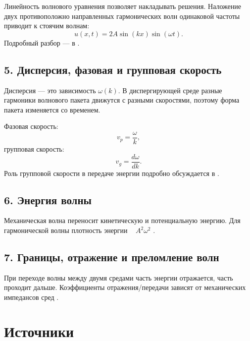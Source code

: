 Линейность волнового уравнения позволяет накладывать решения. Наложение двух 
противоположно направленных гармонических волн одинаковой частоты приводит к стоячим волнам:
\[
u(x,t) = 2A \sin(kx) \sin(\omega t).
\]
Подробный разбор — в \cite{openstax-waves, mit803}.

\subsection*{5. Дисперсия, фазовая и групповая скорость}

Дисперсия — это зависимость \(\omega(k)\). В диспергирующей среде разные гармоники волнового пакета движутся 
с разными скоростями, поэтому форма пакета изменяется со временем.

Фазовая скорость:
\[
v_p = \frac{\omega}{k},
\]
групповая скорость:
\[
v_g = \frac{d\omega}{dk}.
\]
Роль групповой скорости в передаче энергии подробно обсуждается в \cite{mit803}.

\subsection*{6. Энергия волны}

Механическая волна переносит кинетическую и потенциальную энергию. Для гармонической волны 
плотность энергии ~ \(A^2 \omega^2\) \cite{feynman, openstax-waves}.

\subsection*{7. Границы, отражение и преломление волн}

При переходе волны между двумя средами часть энергии отражается, часть проходит дальше. 
Коэффициенты отражения/передачи зависят от механических импедансов сред \cite{mit803, purdue-waves}.


\section*{Источники}

